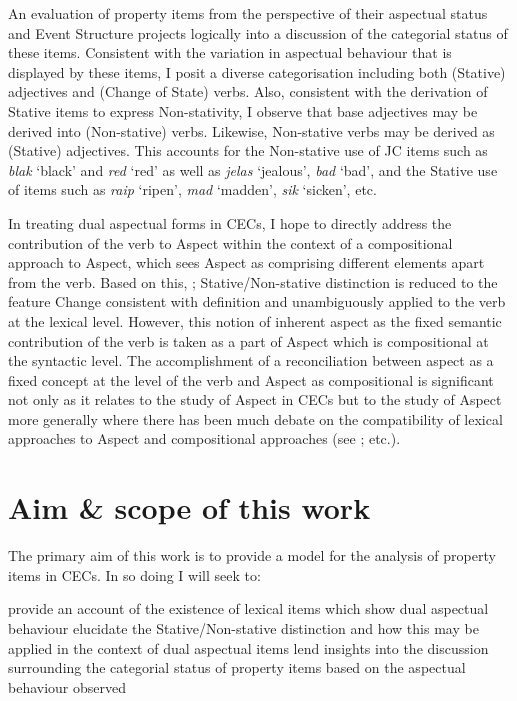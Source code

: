 An evaluation of property items from the perspective of their aspectual status
and Event Structure projects logically into a discussion of the categorial
status of these items.  Consistent with the variation in aspectual behaviour
that is displayed by these items, I posit a diverse categorisation including
both (Stative) adjectives and (Change of State) verbs.  Also, consistent with
the derivation of Stative items to express Non-stativity, I observe that base
adjectives may be derived into (Non-stative) verbs.  Likewise, Non-stative verbs
may be derived as (Stative) adjectives.  This accounts for the Non-stative use
of JC items such as \textit{blak} `black' and \textit{red} `red' as well as
\textit{jelas} `jealous', \textit{bad} `bad', and the Stative use of items such
as \textit{raip} `ripen', \textit{mad} `madden', \textit{sik} `sicken', etc.

In treating dual aspectual forms in CECs, I hope to directly address the
contribution of the verb to Aspect within the context of a compositional
approach to Aspect, which sees Aspect as comprising different elements apart
from the verb.  Based on this, ; Stative\slash Non-stative
distinction is reduced to the feature Change consistent with
 definition and unambiguously applied to the verb at the
lexical level.  However, this notion of inherent aspect as the fixed semantic
contribution of the verb is taken as a part of Aspect which is compositional at
the syntactic level.  The accomplishment of a reconciliation between aspect as a
fixed concept at the level of the verb and Aspect as compositional is
significant not only as it relates to the study of Aspect in CECs but to the
study of Aspect more generally where there has been much debate on the
compatibility of lexical approaches to Aspect and compositional approaches (see
\citealt{Rothstein2004,Tenny1994,Verkuyl1999}; etc.).

\section{Aim \& scope of this work}\label{sec:1.7}

The primary aim of this work is to provide a model for the analysis of property
items in CECs.  In so doing I will seek to:

\ea\label{ex:1:10}
  \ea provide an account of the existence of lexical items which show dual
  aspectual behaviour
  \ex elucidate the Stative\slash Non-stative distinction and how this may be applied
  in the context of dual aspectual items
  \ex lend insights into the discussion surrounding the categorial status of
  property items based on the aspectual behaviour observed
  \z
\z

